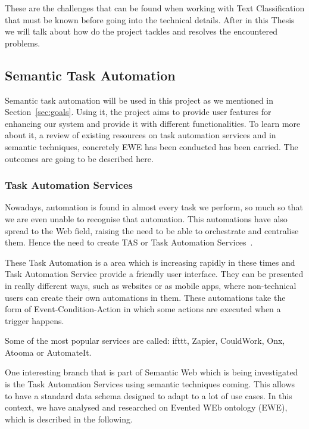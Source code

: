 These are the challenges that can be found when working with Text Classification that must be known before going into the technical details. After in this Thesis we will talk about how do the project tackles and resolves the encountered problems. 

\subsection{Semantic Task Automation}

Semantic task automation will be used in this project as we mentioned in Section~\ref{sec:goals}. Using it, the project aims to provide user features for enhancing our system and provide it with different functionalities. To learn more about it, a review of existing resources on task automation services and in semantic techniques, concretely EWE has been conducted has been carried. The outcomes are going to be described here.

\subsubsection{Task Automation Services}
Nowadays, automation is found in almost every task we perform, so much so that we are even unable to recognise that automation. This automations have also spread to the Web field, raising the need to be able to orchestrate and centralise them. Hence the need to create TAS or Task Automation Services~\cite{7155422}.

These Task Automation is a area which is increasing rapidly in these times and Task Automation Service provide a friendly user interface. They can be presented in really different ways, such as websites or as mobile apps, where non-technical users can create their own automations in them. These automations take the form of Event-Condition-Action in which some actions are executed when a trigger happens. 

Some of the most popular services are called: ifttt, Zapier, CouldWork, Onx, Atooma or AutomateIt.

One interesting branch that is part of Semantic Web which is being investigated~\cite{electronics9081194} is the Task Automation Services using semantic techniques coming. This allows to have a standard data schema designed to adapt to a lot of use cases. In this context, we have analysed and researched on Evented WEb ontology (EWE), which is described in the following.

